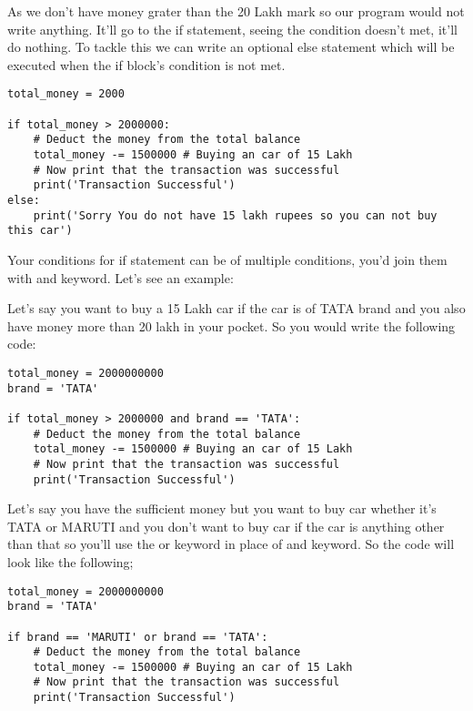 \noindent As we don't have money grater than the 20 Lakh mark so our program would not write anything. It'll go to the if statement, seeing the condition doesn't met, it'll do nothing. To tackle this we can write an optional else statement which will be executed when the if block's condition is not met.

\noindent\begin{minipage}{\linewidth}
\begin{lstlisting}[style=python]
total_money = 2000

if total_money > 2000000:
    # Deduct the money from the total balance
    total_money -= 1500000 # Buying an car of 15 Lakh
    # Now print that the transaction was successful
    print('Transaction Successful')
else:
    print('Sorry You do not have 15 lakh rupees so you can not buy this car')
\end{lstlisting}
\end{minipage}

\noindent Your conditions for if statement can be of multiple conditions, you'd join them with and keyword. Let's see an example:

\noindent Let's say you want to buy a 15 Lakh car if the car is of TATA brand and you also have money more than 20 lakh in your pocket. So you would write the following code:

\noindent\begin{minipage}{\linewidth}
\begin{lstlisting}[style=python]
total_money = 2000000000
brand = 'TATA'

if total_money > 2000000 and brand == 'TATA':
    # Deduct the money from the total balance
    total_money -= 1500000 # Buying an car of 15 Lakh
    # Now print that the transaction was successful
    print('Transaction Successful')
\end{lstlisting}
\end{minipage}


\noindent Let's say you have the sufficient money but you want to buy car whether it's TATA or MARUTI and you don't want to buy car if the car is anything other than that so you'll use the or keyword in place of and keyword. So the code will look like the following;

\noindent\begin{minipage}{\linewidth}
\begin{lstlisting}[style=python]
total_money = 2000000000
brand = 'TATA'

if brand == 'MARUTI' or brand == 'TATA':
    # Deduct the money from the total balance
    total_money -= 1500000 # Buying an car of 15 Lakh
    # Now print that the transaction was successful
    print('Transaction Successful')
\end{lstlisting}
\end{minipage}
